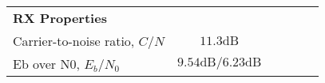 \begin{table}[htbp]
\begin{tabular}{lccccr}
    \rowcolor[rgb]{ 0,  0,  0} \textcolor[rgb]{ 1,  1,  1}{\textbf{RX Properties}}	& \textcolor[rgb]{ 1,  1,  1}{\textbf{}} 		\\
    Carrier-to-noise ratio, $C/N$ 					& $11.3\text{dB}$										\\
    Eb over N0, $E_b/N_0$ 					& $9.54 \text{dB} / 6.23 \text{dB}$					\\
    \end{tabular}
  \label{tab:link_budget}

\end{table}
